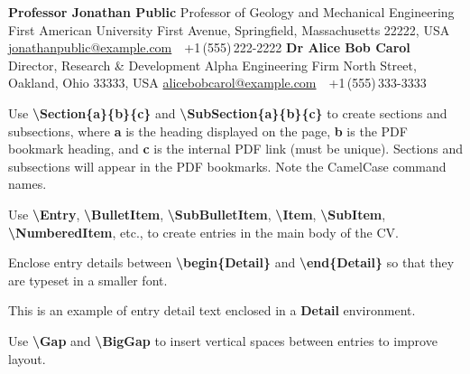 \documentclass[letterpaper,MMMyyyy,nonstopmode]{./simple-resume-cv-master/simpleresumecv}
\newcommand{\Code}[1]{\mbox{\textbf{#1}}}
\newcommand{\CodeCommand}[1]{\mbox{\textbf{\textbackslash{#1}}}}
\begin{document}
\begin{Body}
\BulletItem
	\textbf{Professor Jonathan Public}
	\newline
	Professor of Geology and Mechanical Engineering
	\newline
	First American University
	 First Avenue, Springfield, Massachusetts 22222, USA
	\newline
	\href{mailto:jonathanpublic@example.com}
	{jonathanpublic@example.com}
	\,\SubBulletSymbol\,
	+1\,(555)\,222-2222
\BigGap
\BulletItem
	\textbf{Dr Alice Bob Carol}
	\newline
	Director, Research \& Development
	\newline
	Alpha Engineering Firm
	 North Street, Oakland, Ohio 33333, USA
	\newline
	\href{mailto:alicebobcarol@example.com}
	{alicebobcarol@example.com}
	\,\SubBulletSymbol\,
	+1\,(555)\,333-3333

\begingroup
	\color{red}
	
	\Gap
	\BulletItem
		Use \CodeCommand{Section\{a\}\{b\}\{c\}} and
		\CodeCommand{SubSection\{a\}\{b\}\{c\}}
		to create sections and subsections, where
		\Code{a} is the heading displayed on the page,
		\Code{b} is the PDF bookmark heading, and
		\Code{c} is the internal PDF link (must be unique).
		Sections and subsections will appear in the PDF bookmarks.
		Note the CamelCase command names.
	
	\Gap
	\BulletItem
		Use
		\CodeCommand{Entry},
		\CodeCommand{BulletItem},
		\CodeCommand{SubBulletItem},
		\CodeCommand{Item},
		\CodeCommand{SubItem},
		\CodeCommand{NumberedItem},
		etc.,
		to create entries in the main body of the CV.
	
	\Gap
		\BulletItem
		Enclose entry details between
		\CodeCommand{begin\{Detail\}} and
		\CodeCommand{end\{Detail\}}
		so that they are typeset in a smaller font.
	\begin{Detail}
		\Item
		This is an example of entry detail text enclosed in a \Code{Detail} environment.
	\end{Detail}

	\Gap
	\BulletItem
		Use \CodeCommand{Gap} and \CodeCommand{BigGap} to insert vertical spaces between entries to improve layout.
	\BigGap


\end{Body}
\end{document}
